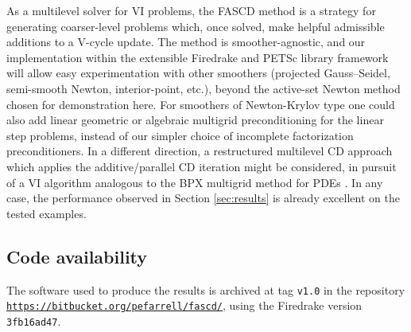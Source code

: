 \documentclass[review,hidelinks,onefignum,onetabnum,final]{siamart220329}  %
\begin{document}
As a multilevel solver for VI problems, the FASCD method is a strategy for generating coarser-level problems which, once solved, make helpful admissible additions to a V-cycle update.  The method is smoother-agnostic, and our implementation within the extensible Firedrake \cite{Rathgeberetal2016} and PETSc \cite{Balayetal2023} library framework will allow easy experimentation with other smoothers (projected Gauss--Seidel, semi-smooth Newton, interior-point, etc.), beyond the active-set Newton method chosen for demonstration here.  For smoothers of Newton-Krylov type one could also add linear geometric or algebraic multigrid preconditioning \cite{Trottenbergetal2001} for the linear step problems, instead of our simpler choice of incomplete factorization preconditioners.  In a different direction, a restructured multilevel CD approach which applies the additive/parallel CD iteration \cite{Tai2003} might be considered, in pursuit of a VI algorithm analogous to the BPX multigrid method for PDEs \cite{BramblePasciakXu1990}.  In any case, the performance observed in Section \ref{sec:results} is already excellent on the tested examples.


\subsection*{Code availability} \label{sec:code}  The software used to produce the results is archived at tag \texttt{v1.0} in the repository \texttt{\url{https://bitbucket.org/pefarrell/fascd/}}, using the Firedrake version \texttt{3fb16ad47}.




\end{document}
